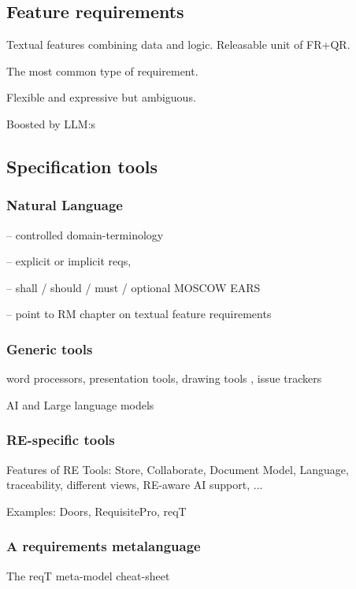 \subsection{Feature requirements}%

Textual features combining data and logic. Releasable unit of FR+QR.

The most common type of requirement.

Flexible and expressive but ambiguous.

Boosted by LLM:s

\subsection{Specification tools}

\subsubsection{Natural Language}

-- controlled domain-terminology 

-- explicit or implicit reqs, 

-- shall / should / must / optional MOSCOW EARS

-- point to RM chapter on textual feature requirements

\subsubsection{Generic tools}
  word processors, presentation tools, drawing tools , issue trackers 

  AI and Large language models 

\subsubsection{RE-specific tools}
  Features of RE Tools: Store, Collaborate, Document Model, Language, traceability, different views, RE-aware AI support, ...

  Examples: Doors, RequisitePro, reqT

\subsubsection{A requirements metalanguage}

The reqT meta-model cheat-sheet




